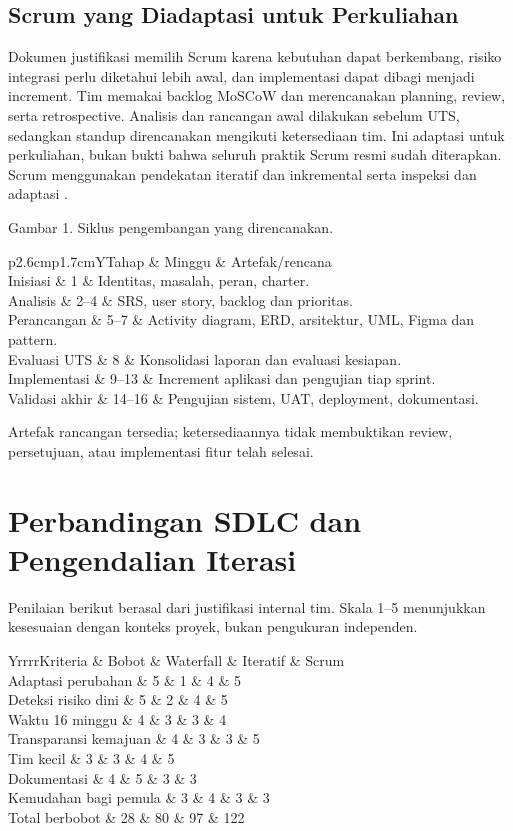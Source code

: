 \documentclass[11pt,a4paper]{article}
\newcommand{\tbl}[2]{\par\smallskip\noindent\begin{tabularx}{\linewidth}{#1}\toprule #2\bottomrule\end{tabularx}\par\smallskip}
\newcommand{\page}[1]{\clearpage\section{#1}}
\begin{document}
\subsection{Scrum yang Diadaptasi untuk Perkuliahan}
Dokumen justifikasi memilih Scrum karena kebutuhan dapat berkembang, risiko integrasi perlu diketahui lebih awal, dan implementasi dapat dibagi menjadi increment. Tim memakai backlog MoSCoW dan merencanakan planning, review, serta retrospective.
Analisis dan rancangan awal dilakukan sebelum UTS, sedangkan standup direncanakan mengikuti ketersediaan tim. Ini adaptasi untuk perkuliahan, bukan bukti bahwa seluruh praktik Scrum resmi sudah diterapkan. Scrum menggunakan pendekatan iteratif dan inkremental serta inspeksi dan adaptasi \cite{scrum}.
\begin{center}\par\small Gambar 1. Siklus pengembangan yang direncanakan.\end{center}
\tbl{p{2.6cm}p{1.7cm}Y}{Tahap & Minggu & Artefak/rencana\\\midrule
Inisiasi & 1 & Identitas, masalah, peran, charter.\\
Analisis & 2--4 & SRS, user story, backlog dan prioritas.\\
Perancangan & 5--7 & Activity diagram, ERD, arsitektur, UML, Figma dan pattern.\\
Evaluasi UTS & 8 & Konsolidasi laporan dan evaluasi kesiapan.\\
Implementasi & 9--13 & Increment aplikasi dan pengujian tiap sprint.\\
Validasi akhir & 14--16 & Pengujian sistem, UAT, deployment, dokumentasi.\\}
Artefak rancangan tersedia; ketersediaannya tidak membuktikan review, persetujuan, atau implementasi fitur telah selesai.
\page{Perbandingan SDLC dan Pengendalian Iterasi}
Penilaian berikut berasal dari justifikasi internal tim. Skala 1--5 menunjukkan kesesuaian dengan konteks proyek, bukan pengukuran independen.
\tbl{Yrrrr}{Kriteria & Bobot & Waterfall & Iteratif & Scrum\\\midrule
Adaptasi perubahan & 5 & 1 & 4 & 5\\
Deteksi risiko dini & 5 & 2 & 4 & 5\\
Waktu 16 minggu & 4 & 3 & 3 & 4\\
Transparansi kemajuan & 4 & 3 & 3 & 5\\
Tim kecil & 3 & 3 & 4 & 5\\
Dokumentasi & 4 & 5 & 3 & 3\\
Kemudahan bagi pemula & 3 & 4 & 3 & 3\\\midrule
Total berbobot & 28 & 80 & 97 & 122\\}
\end{document}
